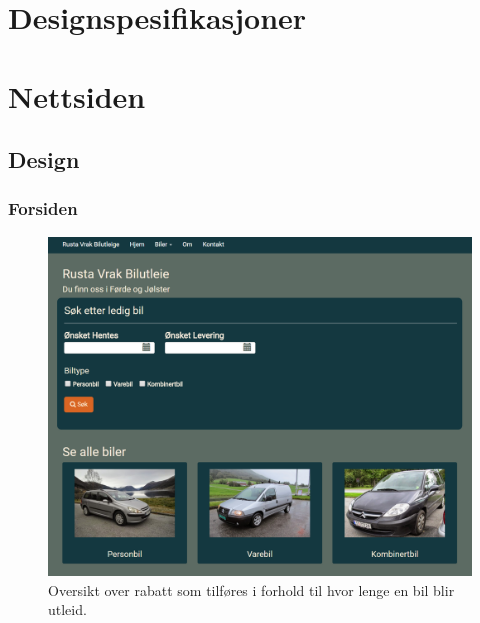 \section{Designspesifikasjoner}

\newpage
\section{Nettsiden}
\subsection{Design}
\subsubsection{Forsiden}
 \begin{figure}[htbp]
	\centering
		\includegraphics[scale=0.3]{Bilder/rv_frontpage.png}
	\caption[Utleiepris Diagram]{Oversikt over rabatt som tilføres i forhold til hvor lenge en bil blir utleid. } %
	\label{fig:rv_frontpage}
\end{figure}


